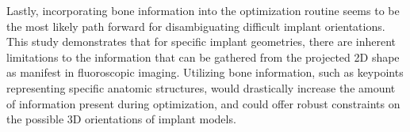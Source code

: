 Lastly, incorporating bone information into the optimization routine seems to be the most likely path forward for disambiguating difficult implant orientations.
This study demonstrates that for specific implant geometries, there are inherent limitations to the information that can be gathered from the projected 2D shape as manifest in fluoroscopic imaging.
Utilizing bone information, such as keypoints representing specific anatomic structures, would drastically increase the amount of information present during optimization, and could offer robust constraints on the possible 3D orientations of implant models.



